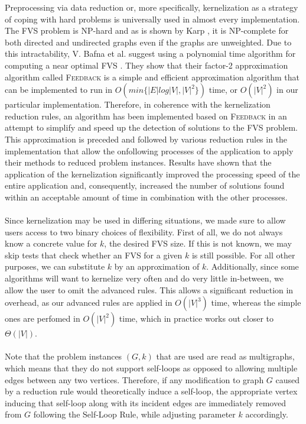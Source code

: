 Preprocessing via data reduction or, more specifically, kernelization as a strategy of coping with hard problems is universally used in almost every implementation. The FVS problem is NP-hard and as is shown by Karp \cite{approx}, it is NP-complete for both directed and undirected graphs even if the graphs are unweighted. Due to this intractability, V. Bafna et al. suggest using a polynomial time algorithm for computing a near optimal FVS \cite{approx}. They show that their factor-2 approximation algorithm called \textsc{Feedback} is a simple and efficient approximation algorithm that can be implemented to run in $O(min\{|E| log |V |, |V |^2\})$ time, or $O(|V |^2)$ in our particular implementation. Therefore, in coherence with the kernelization reduction rules, an algorithm has been implemented based on \textsc{Feedback} in an attempt to simplify and speed up the detection of solutions to the FVS problem. This approximation is preceded and followed by various reduction rules in the implementation that allow the onfollowing processes of the application to apply their methods to reduced problem instances. Results have shown that the application of the kernelization significantly improved the processing speed of the entire application and, consequently, increased the number of solutions found within an acceptable amount of time in combination with the other processes. \\\\
Since kernelization may be used in differing situations, we made sure to allow users access to two binary choices of flexibility. First of all, we do not always know a concrete value for $k$, the desired FVS size. If this is not known, we may skip tests that check whether an FVS for a given $k$ is still possible. For all other purposes, we can substitute $k$ by an approximation of $k$. Additionally, since some algorithms will want to kernelize very often and do very little in-between, we allow the user to omit the advanced rules. This allows a significant reduction in overhead, as our advanced rules are applied in $O(|V|^3)$ time, whereas the simple ones are perfomed in $O(|V|^2)$ time, which in practice works out closer to $\Theta(|V|)$.\\\\
Note that the problem instances $(G,k)$ that are used are read as multigraphs, which means that they do not support self-loops as opposed to allowing multiple edges between any two vertices. Therefore, if any modification to graph $G$ caused by a reduction rule would theoretically induce a self-loop, the appropriate vertex inducing that self-loop along with its incident edges are immediately removed from $G$ following the Self-Loop Rule, while adjusting parameter $k$ accordingly.

